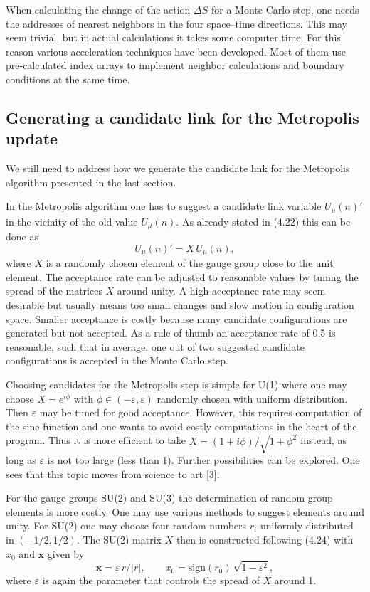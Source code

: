 When calculating the change of the action $\Delta S$ for a Monte Carlo step, one
needs the addresses of nearest neighbors in the four space--time directions.
This may seem trivial, but in actual calculations it takes some computer time.
For this reason various acceleration techniques have been developed. Most of
them use pre-calculated index arrays to implement neighbor calculations and
boundary conditions at the same time.

\subsection{Generating a candidate link for the Metropolis update}

We still need to address how we generate the candidate link for the Metropolis
algorithm presented in the last section.

In the Metropolis algorithm one has to suggest a candidate link variable
$U_\mu(n)'$ in the vicinity of the old value $U_\mu(n)$. As already stated in (4.22) this
can be done as
\begin{equation}
  U_\mu(n)' = X\,U_\mu(n),
\end{equation}
where $X$ is a randomly chosen element of the gauge group close to the unit element. The acceptance rate can be adjusted to reasonable values by tuning the
spread of the matrices $X$ around unity. A high acceptance rate may seem desirable but usually means too small changes and slow motion in configuration
space. Smaller acceptance is costly because many candidate configurations
are generated but not accepted. As a rule of thumb an acceptance rate of
0.5 is reasonable, such that in average, one out of two suggested candidate
configurations is accepted in the Monte Carlo step.

Choosing candidates for the Metropolis step is simple for U(1) where one
may choose $X = e^{i\phi}$ with $\phi \in (-\varepsilon, \varepsilon)$ randomly chosen with uniform distribution. Then $\varepsilon$ may be tuned for good acceptance. However, this requires computation of the sine function and one wants to avoid costly computations
in the heart of the program. Thus it is more efficient to take $X = (1 + i\phi)/\sqrt{1 + \phi^2}$
instead, as long as $\varepsilon$ is not too large (less than 1). Further possibilities can be
explored. One sees that this topic moves from science to art [3].

For the gauge groups SU(2) and SU(3) the determination of random group
elements is more costly. One may use various methods to suggest elements
around unity. For SU(2) one may choose four random numbers $r_i$ uniformly
distributed in $(-1/2, 1/2)$. The SU(2) matrix $X$ then is constructed following
(4.24) with $x_0$ and $\mathbf{x}$ given by
\begin{equation}
  \mathbf{x} = \varepsilon\,r/|r|, \qquad
  x_0 = \mathrm{sign}(r_0)\,\sqrt{1 - \varepsilon^2},
\end{equation}
where $\varepsilon$ is again the parameter that controls the spread of $X$ around 1.

